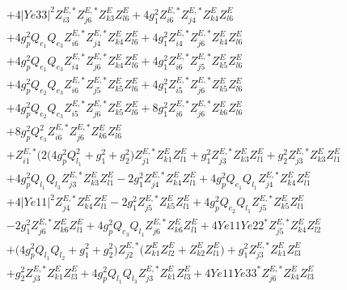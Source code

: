 \begin{align}
 &+4 |Ye33|^2 Z^{E,*}_{i 3} Z^{E,*}_{j 6} Z_{{k 3}}^{E} Z_{{l 6}}^{E} +4 g_{1}^{2} Z^{E,*}_{i 6} Z^{E,*}_{j 4} Z_{{k 4}}^{E} Z_{{l 6}}^{E} \nonumber \\ 
 &+4 g_{p}^{2} Q_{e_{1}} Q_{e_3} Z^{E,*}_{i 6} Z^{E,*}_{j 4} Z_{{k 4}}^{E} Z_{{l 6}}^{E} +4 g_{1}^{2} Z^{E,*}_{i 4} Z^{E,*}_{j 6} Z_{{k 4}}^{E} Z_{{l 6}}^{E} \nonumber \\ 
 &+4 g_{p}^{2} Q_{e_{1}} Q_{e_3} Z^{E,*}_{i 4} Z^{E,*}_{j 6} Z_{{k 4}}^{E} Z_{{l 6}}^{E} +4 g_{1}^{2} Z^{E,*}_{i 6} Z^{E,*}_{j 5} Z_{{k 5}}^{E} Z_{{l 6}}^{E} \nonumber \\ 
 &+4 g_{p}^{2} Q_{e_{2}} Q_{e_3} Z^{E,*}_{i 6} Z^{E,*}_{j 5} Z_{{k 5}}^{E} Z_{{l 6}}^{E} +4 g_{1}^{2} Z^{E,*}_{i 5} Z^{E,*}_{j 6} Z_{{k 5}}^{E} Z_{{l 6}}^{E} \nonumber \\ 
 &+4 g_{p}^{2} Q_{e_{2}} Q_{e_3} Z^{E,*}_{i 5} Z^{E,*}_{j 6} Z_{{k 5}}^{E} Z_{{l 6}}^{E} +8 g_{1}^{2} Z^{E,*}_{i 6} Z^{E,*}_{j 6} Z_{{k 6}}^{E} Z_{{l 6}}^{E} \nonumber \\ 
 &+8 g_{p}^{2} Q_{e_3}^{2} Z^{E,*}_{i 6} Z^{E,*}_{j 6} Z_{{k 6}}^{E} Z_{{l 6}}^{E} \nonumber \\ 
 &+Z^{E,*}_{i 1} \Big(2 \Big(4 g_{p}^{2} Q_{l_1}^{2}  + g_{1}^{2} + g_{2}^{2}\Big)Z^{E,*}_{j 1} Z_{{k 1}}^{E} Z_{{l 1}}^{E} +g_{1}^{2} Z^{E,*}_{j 3} Z_{{k 3}}^{E} Z_{{l 1}}^{E} +g_{2}^{2} Z^{E,*}_{j 3} Z_{{k 3}}^{E} Z_{{l 1}}^{E} \nonumber \\ 
 &+4 g_{p}^{2} Q_{l_1} Q_{l_3} Z^{E,*}_{j 3} Z_{{k 3}}^{E} Z_{{l 1}}^{E} -2 g_{1}^{2} Z^{E,*}_{j 4} Z_{{k 4}}^{E} Z_{{l 1}}^{E} +4 g_{p}^{2} Q_{e_{1}} Q_{l_1} Z^{E,*}_{j 4} Z_{{k 4}}^{E} Z_{{l 1}}^{E} \nonumber \\ 
 &+4 |Ye11|^2 Z^{E,*}_{j 4} Z_{{k 4}}^{E} Z_{{l 1}}^{E} -2 g_{1}^{2} Z^{E,*}_{j 5} Z_{{k 5}}^{E} Z_{{l 1}}^{E} +4 g_{p}^{2} Q_{e_{2}} Q_{l_1} Z^{E,*}_{j 5} Z_{{k 5}}^{E} Z_{{l 1}}^{E} \nonumber \\ 
 &-2 g_{1}^{2} Z^{E,*}_{j 6} Z_{{k 6}}^{E} Z_{{l 1}}^{E} +4 g_{p}^{2} Q_{e_3} Q_{l_1} Z^{E,*}_{j 6} Z_{{k 6}}^{E} Z_{{l 1}}^{E} +4 Ye11 Ye22^* Z^{E,*}_{j 5} Z_{{k 4}}^{E} Z_{{l 2}}^{E} \nonumber \\ 
 &+\Big(4 g_{p}^{2} Q_{l_1} Q_{l_2}  + g_{1}^{2} + g_{2}^{2}\Big)Z^{E,*}_{j 2} \Big(Z_{{k 1}}^{E} Z_{{l 2}}^{E}  + Z_{{k 2}}^{E} Z_{{l 1}}^{E} \Big)+g_{1}^{2} Z^{E,*}_{j 3} Z_{{k 1}}^{E} Z_{{l 3}}^{E} \nonumber \\ 
 &+g_{2}^{2} Z^{E,*}_{j 3} Z_{{k 1}}^{E} Z_{{l 3}}^{E} +4 g_{p}^{2} Q_{l_1} Q_{l_3} Z^{E,*}_{j 3} Z_{{k 1}}^{E} Z_{{l 3}}^{E} +4 Ye11 Ye33^* Z^{E,*}_{j 6} Z_{{k 4}}^{E} Z_{{l 3}}^{E} \nonumber \\ 

\end{align}
